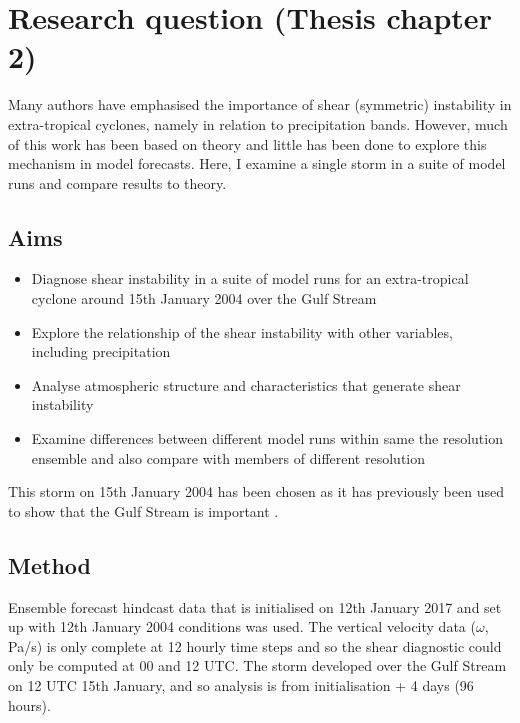 
\chapter {Research question (Thesis chapter 2)} \label{Ch2}

Many authors have emphasised the importance of shear (symmetric) instability in extra-tropical cyclones, namely in relation to precipitation bands. However, much of this work has been based on theory and little has been done to explore this mechanism in model forecasts. Here, I examine a single storm in a suite of model runs and compare results to theory.

\section{Aims}
\begin{itemize}
	\item Diagnose shear instability in a suite of model runs for an extra-tropical cyclone around 15th January 2004 over the Gulf Stream
	\item Explore the relationship of the shear instability with other variables, including precipitation
	\item Analyse atmospheric structure and characteristics that generate shear instability
	\item Examine differences between different model runs within same the resolution ensemble and also compare with members of different resolution
\end{itemize}

This storm on 15th January 2004 has been chosen as it has previously been used to show that the Gulf Stream is important \citep{sheldon2017warm}. 



\section {Method}  \label{method}

Ensemble forecast hindcast data that is initialised on 12th January 2017 and set up with 12th January 2004 conditions was used. The vertical velocity data ($\omega$, Pa/s) is only complete at 12 hourly time steps and so the shear diagnostic could only be computed at 00 and 12 UTC. The storm developed over the Gulf Stream on 12 UTC 15th January, and so analysis is from initialisation + 4 days (96 hours).
%
%



